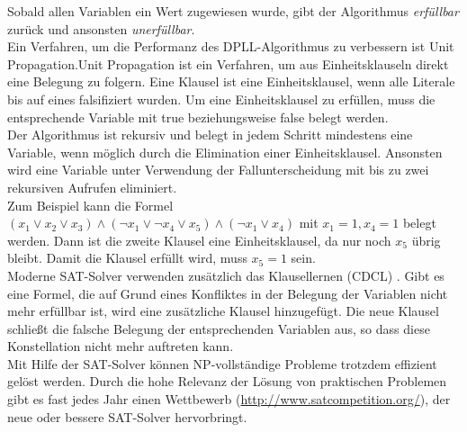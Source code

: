 \documentclass[a4,abstract=on]{scrartcl}
\begin{document}
Sobald allen Variablen ein Wert zugewiesen wurde, gibt der Algorithmus \emph{erfüllbar} zurück und ansonsten \emph{unerfüllbar}.\\
Ein Verfahren, um die Performanz des DPLL-Algorithmus zu verbessern ist Unit Propagation.Unit Propagation ist ein Verfahren, um aus Einheitsklauseln direkt eine Belegung zu folgern. Eine Klausel ist eine Einheitsklausel, wenn alle Literale bis auf eines falsifiziert wurden. Um eine Einheitsklausel zu erfüllen, muss die entsprechende Variable mit true beziehungsweise false belegt werden.\\
Der Algorithmus ist rekursiv und belegt in jedem Schritt mindestens eine Variable, wenn möglich durch die Elimination einer Einheitsklausel. Ansonsten wird eine Variable unter Verwendung der Fallunterscheidung mit bis zu zwei rekursiven Aufrufen eliminiert.\\
Zum Beispiel kann die Formel $(x_1 \vee x_2 \vee x_3) \wedge (\neg x_1 \vee \neg x_4 \vee x_5) \wedge (\neg x_1 \vee x_4)$ mit $x_1=1, x_4=1$ belegt werden. Dann ist die zweite Klausel eine Einheitsklausel, da nur noch $x_5$ übrig bleibt. Damit die Klausel erfüllt wird, muss $x_5 = 1$ sein. \\
Moderne SAT-Solver verwenden zusätzlich das Klausellernen (CDCL) \cite[vgl.][]{cdcl}. Gibt es eine Formel, die auf Grund eines Konfliktes in der Belegung der Variablen nicht mehr erfüllbar ist, wird eine zusätzliche Klausel hinzugefügt. Die neue Klausel schließt die falsche Belegung der entsprechenden Variablen aus, so dass diese Konstellation nicht mehr auftreten kann.\\
Mit Hilfe der SAT-Solver können NP-vollständige Probleme trotzdem effizient gelöst werden. Durch die hohe Relevanz der Lösung von praktischen Problemen gibt es fast jedes Jahr einen Wettbewerb (\url{http://www.satcompetition.org/}), der neue oder bessere SAT-Solver hervorbringt.

\end{document}
